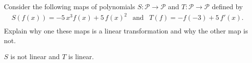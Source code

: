 
\begin{exerciseStatement}


Consider the following maps of polynomials \(S:\mathcal{P}\rightarrow\mathcal{P}\) and \(T:\mathcal{P}\rightarrow\mathcal{P}\) defined by 
\begin{align*} S(f(x))= -5 \, x^{3} f\left(x\right) + 5 \, f\left(x\right)^{2}  & \text{and} & T(f)= -f\left(-3\right) + 5 \, f'\left(x\right) . \\ \end{align*}
             Explain why one these maps is a linear transformation and why the other map is not. 


\end{exerciseStatement}
    
\begin{exerciseAnswer} 


\(S\) is not linear and \(T\) is linear.


\end{exerciseAnswer}
    
